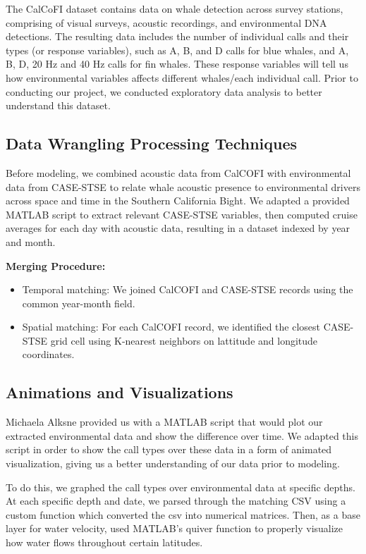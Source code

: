 \documentclass[
]{article}
\begin{document}
The CalCoFI dataset contains data on whale detection across survey
stations, comprising of visual surveys, acoustic recordings, and
environmental DNA detections. The resulting data includes the number of
individual calls and their types (or response variables), such as A, B,
and D calls for blue whales, and A, B, D, 20 Hz and 40 Hz calls for fin
whales. These response variables will tell us how environmental
variables affects different whales/each individual call. Prior to
conducting our project, we conducted exploratory data analysis to better
understand this dataset.

\subsection{Data Wrangling Processing
Techniques}\label{data-wrangling-processing-techniques}

Before modeling, we combined acoustic data from CalCOFI with
environmental data from CASE-STSE to relate whale acoustic presence to
environmental drivers across space and time in the Southern California
Bight. We adapted a provided MATLAB script to extract relevant CASE-STSE
variables, then computed cruise averages for each day with acoustic
data, resulting in a dataset indexed by year and month.

\textbf{Merging Procedure:}

\begin{itemize}
\item
  Temporal matching: We joined CalCOFI and CASE-STSE records using the
  common year-month field.
\item
  Spatial matching: For each CalCOFI record, we identified the closest
  CASE-STSE grid cell using K-nearest neighbors on lattitude and
  longitude coordinates.
\end{itemize}

\subsection{Animations and
Visualizations}\label{animations-and-visualizations}

Michaela Alksne provided us with a MATLAB script that would plot our
extracted environmental data and show the difference over time. We
adapted this script in order to show the call types over these data in a
form of animated visualization, giving us a better understanding of our
data prior to modeling.

To do this, we graphed the call types over environmental data at
specific depths. At each specific depth and date, we parsed through the
matching CSV using a custom function which converted the csv into
numerical matrices. Then, as a base layer for water velocity, used
MATLAB's quiver function to properly visualize how water flows
throughout certain latitudes.
\end{document}
